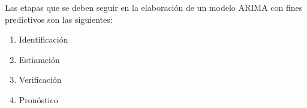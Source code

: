 \documentclass[
]{book}
\providecommand{\tightlist}{%
  \setlength{\itemsep}{0pt}\setlength{\parskip}{0pt}}
\begin{document}
Las etapas que se deben seguir en la elaboración de un modelo ARIMA con fines predictivos son las siguientes:

\begin{enumerate}
\def\labelenumi{\arabic{enumi}.}
\tightlist
\item
  Identificación
\item
  Estiamción
\item
  Verificación
\item
  Pronóstico
\end{enumerate}

  
\end{document}
